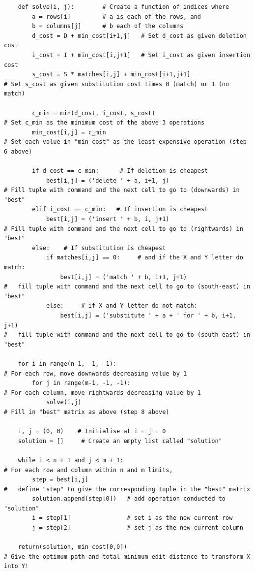 \documentclass{article}
\begin{document}
\begin{lstlisting}
    def solve(i, j):        # Create a function of indices where
        a = rows[i]         # a is each of the rows, and
        b = columns[j]      # b each of the columns
        d_cost = D + min_cost[i+1,j]   # Set d_cost as given deletion cost 
        i_cost = I + min_cost[i,j+1]   # Set i_cost as given insertion cost 
        s_cost = S * matches[i,j] + min_cost[i+1,j+1]     
# Set s_cost as given substitution cost times 0 (match) or 1 (no match)
        
        c_min = min(d_cost, i_cost, s_cost)               
# Set c_min as the minimum cost of the above 3 operations
        min_cost[i,j] = c_min                             
# Set each value in "min_cost" as the least expensive operation (step 6 above)
        
        if d_cost == c_min:      # If deletion is cheapest
            best[i,j] = ('delete ' + a, i+1, j)           
# Fill tuple with command and the next cell to go to (downwards) in "best"
        elif i_cost == c_min:   # If insertion is cheapest
            best[i,j] = ('insert ' + b, i, j+1)           
# Fill tuple with command and the next cell to go to (rightwards) in "best"
        else:    # If substitution is cheapest
            if matches[i,j] == 0:     # and if the X and Y letter do match:
                best[i,j] = ('match ' + b, i+1, j+1)      
#   fill tuple with command and the next cell to go to (south-east) in "best"
            else:     # if X and Y letter do not match:
                best[i,j] = ('substitute ' + a + ' for ' + b, i+1, j+1) 
#   fill tuple with command and the next cell to go to (south-east) in "best"

    for i in range(n-1, -1, -1):                          
# For each row, move downwards decreasing value by 1 
        for j in range(m-1, -1, -1):                      
# For each column, move rightwards decreasing value by 1 
            solve(i,j)                                    
# Fill in "best" matrix as above (step 8 above)
            
    i, j = (0, 0)    # Initialise at i = j = 0
    solution = []     # Create an empty list called "solution"
    
    while i < n + 1 and j < m + 1:                        
# For each row and column within n and m limits,
        step = best[i,j]                                  
#   define "step" to give the corresponding tuple in the "best" matrix
        solution.append(step[0])   # add operation conducted to "solution"
        i = step[1]                # set i as the new current row
        j = step[2]                # set j as the new current column
    
    return(solution, min_cost[0,0])                       
# Give the optimum path and total minimum edit distance to transform X into Y!   
\end{lstlisting}
\end{document}
